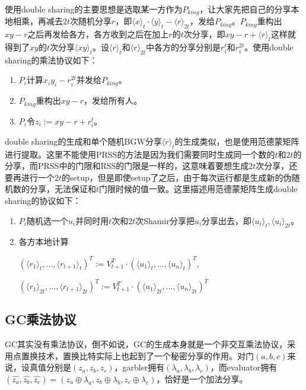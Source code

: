 \documentclass[UTF8]{ctexart}
\theoremstyle{nonumberplain}
\theoremstyle{plain}
\begin{document}
使用double sharing的主要思想是选取某一方作为$P_{king}$，让大家先把自己的分享本地相乘，再减去$2t$次随机分享$r$，即$\langle x\rangle_t\cdot \langle y\rangle_t-\langle r\rangle_{2t}$，发给$P_{king}$。$P_{king}$重构出$xy-r$之后再发给各方，各方收到之后在加上$r$的$t$次分享，即$xy-r+\langle r \rangle_t$这样就得到了$xy$的$t$次分享$\langle xy\rangle_{t}$。设$\langle r\rangle_t$和$\langle r\rangle_{2t}$中各方的分享分别是$r^{t}_i$和$r^{2t}_i$。使用double sharing的乘法协议如下：
\begin{enumerate}
\item $P_i$计算$x_iy_i-r_i^{2t}$并发给$P_{king}$。
\item $P_{king}$重构出$xy-r$，发给所有人。
\item $P_i$令$z_i:=xy-r+r_i^t$。
\end{enumerate}

double sharing的生成和单个随机BGW分享$\langle r\rangle_t$的生成类似，也是使用范德蒙矩阵进行提取。这里不能使用PRSS的方法是因为我们需要同时生成同一个数的$t$和$2t$的分享，而PRSS中的门限和RSS的门限是一样的，这意味着要想生成$2t$次分享，还要再进行一个$2t$的setup，但是即使setup了之后，由于每次运行都是生成新的伪随机数的分享，无法保证和$t$门限时候的值一致。这里描述用范德蒙矩阵生成double sharing的协议如下：
\begin{enumerate}
\item $P_i$随机选一个$u_i$并同时用$t$次和$2t$次Shamir分享把$u_i$分享出去，即$\langle u_i\rangle_t,\langle u_i\rangle_{2t}$。
\item 各方本地计算

$(\langle r_1\rangle_t,\dots,\langle r_{t+1}\rangle_t)^T:=V_{t+1}^T\cdot (\langle u_1\rangle_t,\dots,\langle u_n\rangle_t)^T,$

$(\langle r_1\rangle_{2t},\dots,\langle r_{t+1}\rangle_{2t})^T:=V_{t+1}^T\cdot (\langle u_1\rangle_{2t},\dots,\langle u_n\rangle_{2t})^T$
\end{enumerate}
\subsection{GC乘法协议}
GC其实没有乘法协议，倒不如说，GC的生成本身就是一个非交互乘法协议，采用点置换技术，置换比特实际上也起到了一个秘密分享的作用。对门$(a,b,c)$来说，设真值分别是$(z_a,z_b,z_c)$，garbler拥有$(\lambda_a,\lambda_b,\lambda_c)$，而evaluator拥有$(\hat{z_a},\hat{z_b},\hat{z_c})=(z_a\oplus \lambda_a,z_b\oplus \lambda_b,z_c\oplus \lambda_c)$，恰好是一个加法分享。

\end{document}
